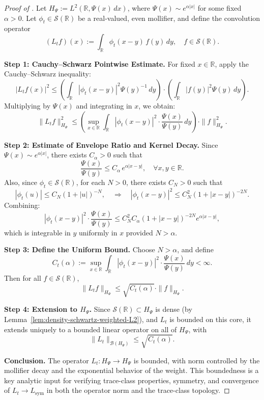 \begin{proof}[Proof of ]
Let \( H_\Psi := L^2(\mathbb{R}, \Psi(x)\, dx) \), where \( \Psi(x) \sim e^{\alpha |x|} \) for some fixed \( \alpha > 0 \). Let \( \phi_t \in \mathcal{S}(\mathbb{R}) \) be a real-valued, even mollifier, and define the convolution operator
\[
(L_t f)(x) := \int_{\mathbb{R}} \phi_t(x - y)\, f(y)\, dy, \quad f \in \mathcal{S}(\mathbb{R}).
\]

\medskip
\noindent\textbf{Step 1: Cauchy–Schwarz Pointwise Estimate.}
For fixed \( x \in \mathbb{R} \), apply the Cauchy–Schwarz inequality:
\[
|L_t f(x)|^2 \le \left( \int_{\mathbb{R}} |\phi_t(x - y)|^2 \Psi(y)^{-1}\, dy \right)
                \cdot \left( \int_{\mathbb{R}} |f(y)|^2 \Psi(y)\, dy \right).
\]
Multiplying by \( \Psi(x) \) and integrating in \( x \), we obtain:
\[
\| L_t f \|_{H_\Psi}^2 \le \left( \sup_{x \in \mathbb{R}} \int_{\mathbb{R}} |\phi_t(x - y)|^2 \cdot \frac{\Psi(x)}{\Psi(y)}\, dy \right) \cdot \| f \|_{H_\Psi}^2.
\]

\medskip
\noindent\textbf{Step 2: Estimate of Envelope Ratio and Kernel Decay.}
Since \( \Psi(x) \sim e^{\alpha |x|} \), there exists \( C_\alpha > 0 \) such that
\[
\frac{\Psi(x)}{\Psi(y)} \le C_\alpha\, e^{\alpha |x - y|}, \quad \forall x, y \in \mathbb{R}.
\]
Also, since \( \phi_t \in \mathcal{S}(\mathbb{R}) \), for each \( N > 0 \), there exists \( C_N > 0 \) such that
\[
|\phi_t(u)| \le C_N (1 + |u|)^{-N}, \quad \Rightarrow \quad |\phi_t(x - y)|^2 \le C_N^2 (1 + |x - y|)^{-2N}.
\]
Combining:
\[
|\phi_t(x - y)|^2 \cdot \frac{\Psi(x)}{\Psi(y)} \le C_N^2 C_\alpha (1 + |x - y|)^{-2N} e^{\alpha |x - y|},
\]
which is integrable in \( y \) uniformly in \( x \) provided \( N > \alpha \).

\medskip
\noindent\textbf{Step 3: Define the Uniform Bound.}
Choose \( N > \alpha \), and define
\[
C_t(\alpha) := \sup_{x \in \mathbb{R}} \int_{\mathbb{R}} |\phi_t(x - y)|^2 \cdot \frac{\Psi(x)}{\Psi(y)}\, dy < \infty.
\]
Then for all \( f \in \mathcal{S}(\mathbb{R}) \),
\[
\| L_t f \|_{H_\Psi} \le \sqrt{C_t(\alpha)} \cdot \| f \|_{H_\Psi}.
\]

\medskip
\noindent\textbf{Step 4: Extension to \( H_\Psi \).}
Since \( \mathcal{S}(\mathbb{R}) \subset H_\Psi \) is dense (by Lemma~\ref{lem:density-schwartz-weighted-L2}), and \( L_t \) is bounded on this core, it extends uniquely to a bounded linear operator on all of \( H_\Psi \), with
\[
\| L_t \|_{\mathcal{B}(H_\Psi)} \le \sqrt{C_t(\alpha)}.
\]

\medskip
\noindent\textbf{Conclusion.}
The operator \( L_t \colon H_\Psi \to H_\Psi \) is bounded, with norm controlled by the mollifier decay and the exponential behavior of the weight. This boundedness is a key analytic input for verifying trace-class properties, symmetry, and convergence of \( L_t \to L_{\mathrm{sym}} \) in both the operator norm and the trace-class topology.
\end{proof}
